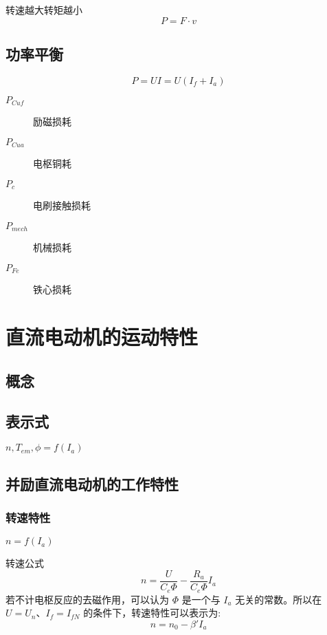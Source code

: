 \documentclass[11pt]{book}
\begin{document}
转速越大转矩越小
$$
	P = F \cdot v
$$
\subsection{功率平衡}%
\label{sub:gong_lu_ping_heng_}

$$
	P = UI = U(I_f + I_a)
$$
\begin{description}
	\item[$P_{Cuf}$] 励磁损耗
	\item[$P_{Cua}$] 电枢铜耗
	\item[$P_c$] 电刷接触损耗
	\item[$P_{mech}$] 机械损耗
	\item[$P_{Fe}$] 铁心损耗
\end{description}

\section{直流电动机的运动特性}%

\subsection{概念}%
\label{sub:gai_nian_}

\subsection{表示式}%
\label{sub:biao_shi_shi_}

$n, T_{em}, \phi = f(I_a)$

\subsection{并励直流电动机的工作特性}

\subsubsection{转速特性}%
\label{ssub:zhuan_su_te_xing_}

$n = f(I_a)$

转速公式
\begin{equation}
	n = \frac{U}{C_e\Phi} - \frac{R_a}{C_e\Phi} I_a
\end{equation}
若不计电枢反应的去磁作用，可以认为 $\Phi$ 是一个与 $I_a$ 无关的常数。所以在 $U = U_n、I_f = I_{fN}$ 的条件下，转速特性可以表示为:
\begin{equation}
 n = n_0 - \beta'I_a
\end{equation}
\end{document}
